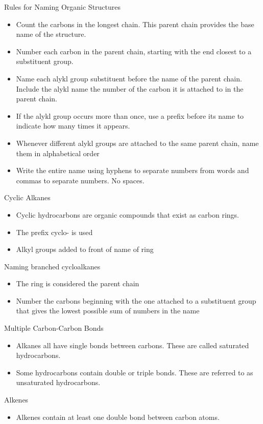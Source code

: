 \documentclass[../hchem.tex]{subfiles}
\begin{document}
Rules for Naming Organic Structures 
\begin{itemize}
    \item Count the carbons in the longest chain. This parent chain provides the base name of the structure.
    \item Number each carbon in the parent chain, starting with the end closest to a substituent group.
    \item Name each alykl group substituent before the name of the parent chain. Include the alykl name the number of the carbon it is attached to in the parent chain.
    \item If the alykl group occurs more than once, use a prefix before its name to indicate how many times it appears.
    \item Whenever different alykl groups are attached to the same parent chain, name them in alphabetical order 
    \item Write the entire name using hyphens to separate numbers from words and commas to separate numbers. No spaces.
\end{itemize}

Cyclic Alkanes 
\begin{itemize}
    \item Cyclic hydrocarbons are organic compounds that exist as carbon rings. 
    \item The prefix cyclo- is used 
    \item Alkyl groups added to front of name of ring 
\end{itemize}

Naming branched cycloalkanes
\begin{itemize}
    \item The ring is considered the parent chain 
    \item Number the carbons beginning with the one attached to a substituent group that gives the lowest possible sum of numbers in the name
\end{itemize}

Multiple Carbon-Carbon Bonds 
\begin{itemize}
    \item Alkanes all have single bonds between carbons. These are called saturated hydrocarbons.
    \item Some hydrocarbons contain double or triple bonds. These are referred to as unsaturated hydrocarbons.
\end{itemize}

Alkenes 
\begin{itemize}
    \item Alkenes contain at least one double bond between carbon atoms.
\end{itemize}
\end{document}
